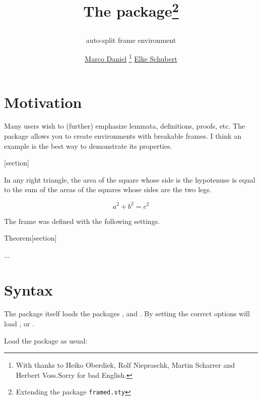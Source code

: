 \documentclass[parskip=false,english,11pt]{ltxmdf}
\title{The \mdname package\footnote{Extending the package \texttt{framed.sty}}
\subtitle{auto-split frame environment}
\author{\href{mailto:marco.daniel@mada-nada.de}{Marco Daniel}%
       \footnote{With thanks to Heiko Oberdiek, Rolf Niepraschk,
                 Martin Scharrer and Herbert Voss.\newline Sorry for bad English.}
          \href{mailto:marco.daniel@mada-nada.de}{Elke Schubert}}}
\date{\svnToday}
\begin{document}
\maketitle

\vspace{2\baselineskip}
\section{Motivation}
Many users wish to (further) emphasize lemmata, definitions, proofs, etc. The package \mdname allows you to create environments with breakable frames. I think an example is the best way to demonstrate its properties.


[section]

\begin{theorem}
 In any right triangle, the area of the square whose side is the hypotenuse
 is equal to the sum of the areas of the squares whose sides are the two legs.
 
\[ a^2+b^2=c^2 \]
\end{theorem}

The frame was defined with the following settings.

\begin{mdexample}
%
    {Theorem}[section]
\begin{theorem}
...
\end{theorem}
\end{mdexample}


\section{Syntax}\label{sec:syntax}
The package itself loads the packages ,  and .
By setting the correct options  will load ,  or .

Load the package as usual:
\begin{mdexample}
 \usepackage[<GLOBAL OPTIONS>]{mdframed}
\end{mdexample}
\end{document}
